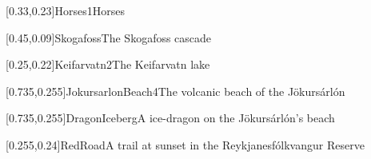 



\graphicspath{{Figures/}{Figures/Iceland/}}


\subtitle{Day 3}
\date{24 June 2026}


    
    [0.33,0.23]{Horses1}{Horses}
    
    
    
    [0.45,0.09]{Skogafoss}{The Skogafoss cascade}
    
    
    [0.25,0.22]{Keifarvatn2}{The Keifarvatn lake}
    
    [0.735,0.255]{JokursarlonBeach4}{The volcanic beach of the J\"okurs\'arl\'on}
    
    [0.735,0.255]{DragonIceberg}{A ice-dragon on the J\"okurs\'arl\'on's beach}
    
    [0.255,0.24]{RedRoad}{A trail at sunset in the Reykjanesf\'olkvangur Reserve}
    

